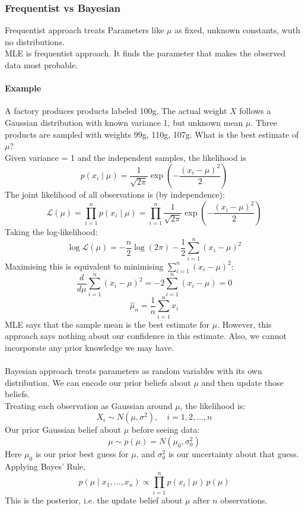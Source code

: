 \documentclass[../Probability.tex]{subfiles}
\begin{document}
\subsubsection{Frequentist vs Bayesian}
Frequentist approach treats Parameters like $\mu$ as fixed, unknown constants, wuth no distributions.\\
MLE is frequentist approach. It finds the parameter that makes the observed data most probable.
\paragraph{Example} A factory produces products labeled 100g. The actual weight $X$ follows a Gaussian distribution with known variance 1, but unknown mean $\mu$.
Three products are sampled with weights 99g, 110g, 107g. What is the best estimate of $\mu$?\\
Given variance = 1 and the independent samples, the likelihood is
$$p(x_i \mid \mu) = \frac{1}{\sqrt{2\pi}} \exp\left(-\frac{(x_i - \mu)^2}{2}\right)$$
The joint likelihood of all observations is (by independence):
$$\mathcal{L}(\mu) = \prod_{i=1}^n p(x_i \mid \mu) = \prod_{i=1}^n \frac{1}{\sqrt{2\pi}} \exp\left(-\frac{(x_i - \mu)^2}{2}\right)$$
Taking the log-likelihood:
$$\log \mathcal{L}(\mu) = -\frac{n}{2}\log(2\pi) - \frac{1}{2}\sum_{i=1}^n (x_i - \mu)^2$$
Maximising this is equivalent to minimising $\sum_{i=1}^n (x_i - \mu)^2$:
$$\frac{d}{d\mu} \sum_{i=1}^n (x_i - \mu)^2 = -2\sum_{i=1}^n (x_i - \mu) = 0$$
$$\boxed{\hat{\mu}_n = \frac{1}{n}\sum_{i=1}^n x_i}$$
MLE says that the sample mean is the best estimate for $\mu$.
However, this approach says nothing about our confidence in this estimate. Also, we cannot incorporate any prior knowledge we may have.\\
\\
Bayesian approach treats parameters as random variables with its own distribution. We can encode our prior beliefs about $\mu$ and then update those beliefs.\\
Treating each observation as Gaussian around $\mu$, the likelihood is:
$$X_i \sim N(\mu, \sigma^2), \quad i = 1, 2, \ldots, n$$
Our prior Gaussian belief about $\mu$ before seeing data:
$$\mu \sim p(\mu) = N(\mu_0, \sigma_0^2)$$
Here $\mu_0$ is our prior best guess for $\mu$, and $\sigma_0^2$ is our uncertainty about that guess.\\
Applying Bayes' Rule,
$$p(\mu \mid x_1, \ldots, x_n) \propto \prod_{i=1}^n p(x_i \mid \mu)\, p(\mu)$$
This is the posterior, i.e. the update belief about $\mu$ after $n$ observations.\\
\end{document}
